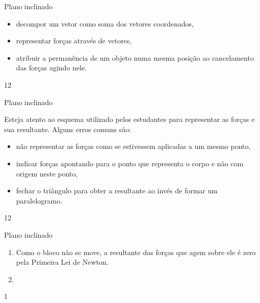 \clearmargin
\begin{objectives}{Plano inclinado}
{
\begin{itemize}
\item {} 
decompor um vetor como soma dos vetores coordenados,

\item {} 
representar forças através de vetores,

\item {} 
atribuir a permanência de um objeto numa mesma posição ao cancelamento das forças agindo nele.

\end{itemize}
}{1}{2}
\end{objectives}
\begin{sugestions}{Plano inclinado}
{
Esteja atento ao esquema utilizado pelos estudantes para representar as forças e sua resultante. Alguns erros comuns são:
\begin{itemize}
\item {} 
não representar as forças como se estivessem aplicadas a um mesmo ponto,

\item {} 
indicar forças apontando para o ponto que representa o corpo e não com origem neste ponto,

\item {} 
fechar o triângulo para obter a resultante ao invés de formar um paralelogramo.

\end{itemize}
}{1}{2}
\end{sugestions}
\begin{answer}{Plano inclinado}
{
\begin{enumerate}
\item {} 
Como o bloco não se move, a resultante das forças que agem sobre ele é zero pela Primeira Lei de Newton.

\item {} 
{
}
\end{enumerate}
}{1}
\end{answer}

